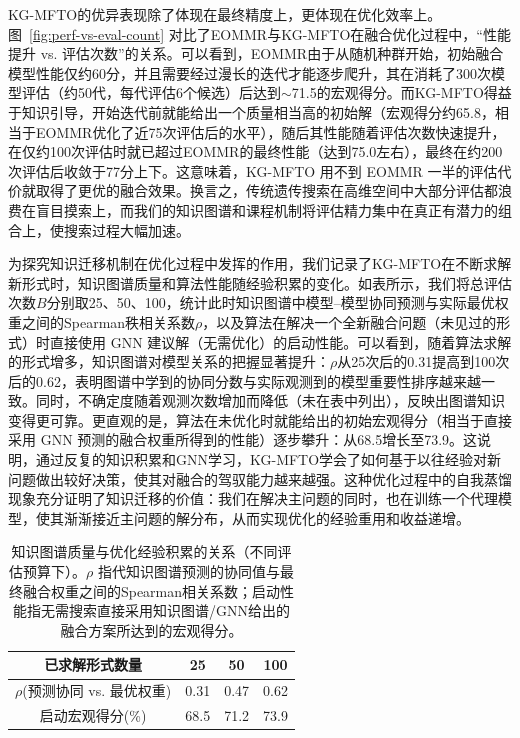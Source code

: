 \documentclass[../main.tex]{subfiles}
\begin{document}
KG-MFTO的优异表现除了体现在最终精度上，更体现在优化效率上。图~\ref{fig:perf-vs-eval-count} 对比了EOMMR与KG-MFTO在融合优化过程中，“性能提升 vs. 评估次数”的关系。可以看到，EOMMR由于从随机种群开始，初始融合模型性能仅约60分，并且需要经过漫长的迭代才能逐步爬升，其在消耗了300次模型评估（约50代，每代评估6个候选）后达到$\sim$71.5的宏观得分。而KG-MFTO得益于知识引导，开始迭代前就能给出一个质量相当高的初始解（宏观得分约65.8，相当于EOMMR优化了近75次评估后的水平），随后其性能随着评估次数快速提升，在仅约100次评估时就已超过EOMMR的最终性能（达到75.0左右），最终在约200次评估后收敛于77分上下。这意味着，KG-MFTO 用不到 EOMMR 一半的评估代价就取得了更优的融合效果。换言之，传统遗传搜索在高维空间中大部分评估都浪费在盲目摸索上，而我们的知识图谱和课程机制将评估精力集中在真正有潜力的组合上，使搜索过程大幅加速。


为探究知识迁移机制在优化过程中发挥的作用，我们记录了KG-MFTO在不断求解新形式时，知识图谱质量和算法性能随经验积累的变化。如表所示，我们将总评估次数$B$分别取25、50、100，统计此时知识图谱中模型--模型协同预测与实际最优权重之间的Spearman秩相关系数$\rho$，以及算法在解决一个全新融合问题（未见过的形式）时直接使用 GNN 建议解（无需优化）的启动性能。可以看到，随着算法求解的形式增多，知识图谱对模型关系的把握显著提升：$\rho$从25次后的0.31提高到100次后的0.62，表明图谱中学到的协同分数与实际观测到的模型重要性排序越来越一致。同时，不确定度随着观测次数增加而降低（未在表中列出），反映出图谱知识变得更可靠。更直观的是，算法在未优化时就能给出的初始宏观得分（相当于直接采用 GNN 预测的融合权重所得到的性能）逐步攀升：从68.5增长至73.9。这说明，通过反复的知识积累和GNN学习，KG-MFTO学会了如何基于以往经验对新问题做出较好决策，使其对融合的驾驭能力越来越强。这种优化过程中的自我蒸馏现象充分证明了知识迁移的价值：我们在解决主问题的同时，也在训练一个代理模型，使其渐渐接近主问题的解分布，从而实现优化的经验重用和收益递增。

\begin{table}[tb]
	\centering
	\caption{知识图谱质量与优化经验积累的关系（不同评估预算下）。$\rho$ 指代知识图谱预测的协同值与最终融合权重之间的Spearman相关系数；启动性能指无需搜索直接采用知识图谱/GNN给出的融合方案所达到的宏观得分。}
	\label{tab:kg-quality}
	\small\begin{tabular}{cccc}
		\toprule
		\textbf{已求解形式数量}      & 25   & 50   & 100  \\
		\midrule
		$\rho$(预测协同 vs. 最优权重) & 0.31 & 0.47 & 0.62 \\
		启动宏观得分(\%)            & 68.5 & 71.2 & 73.9 \\
		\bottomrule
	\end{tabular}
\end{table}
\end{document}
